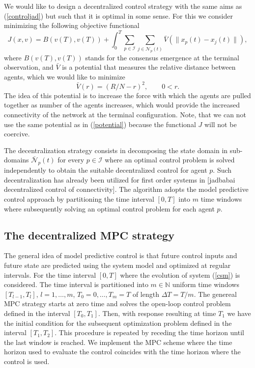 \documentclass[a4paper,10pt, english]{article}
\begin{document}
We would like to design a decentralized control strategy with the same aims as (\ref{controljad}) but such that it is optimal in some sense. 
For this we consider minimizing the following objective functional 
\begin{equation}
J(x, v) = B(v(T), v(T)) + \int_{0}^{T}\sum_{p\in \mathcal{I}}\sum_{j\in \mathcal{N}_p(t)} \bar{V}(\|x_p(t) - x_j(t)\|),
\label{Vt}
\end{equation}
where $B(v(T), v(T))$ stands for the consensus emergence at the terminal observation, and $\bar{V}$ is a potential that measures the relative distance between agents, which we would like to minimize
\begin{equation}
\bar{V}(r) = (R/N- r)^2, \qquad 0 < r.
\label{potentialbar}
\end{equation}
The idea of this potential is to increase the force with which the agents are pulled together as number of the agents increases, which would provide the increased connectivity of the network at the terminal configuration. Note, that we can not use the same potential as in (\ref{potential}) because the functional $J$ will not be coercive.



The decentralization strategy consists in decomposing the state domain in sub-domains $\bar{\mathcal{N}}_p(t)$ for every $p\in \mathcal{I}$ where an optimal control problem is solved independently to obtain the suitable decentralized control for agent $p$. Such decentralization has already been utilized for first order systems in [jadbabai decentralized control of connectivity].
The algorithm adopts the model predictive control approach by partitioning the time interval $[0, T]$ into $m$ time windows where subsequently solving an optimal control problem for each agent $p$.







 \subsection{The decentralized MPC strategy}
 
 The general idea of model predictive control is that future control inputs and future state are predicted using the system model and optimized at regular intervals. For
 the time interval $[0, T]$ where the evolution of system (\ref{csm}) is considered. 
 The time interval is partitioned into $m\in \mathbb{N}$ uniform time windows $[T_{l-1}, T_{l}]$, $l = 1, \dots, m$, $T_0 = 0, \dots, T_m = T$  of length  $\Delta T = T/m$. The genereal MPC strategy starts at zero time and solves the open-loop control problem defined in the interval $[T_0, T_1]$. Then, with response  resulting at time $T_1$ we have the initial condition for the subsequent optimization problem defined in the interval $[T_1, T_2]$. This procedure is repeated by receding the time horizon until the last window is reached. We implement the MPC scheme where the time horizon used to evaluate the control coincides with the time horizon where the control is used.
 
\end{document}
